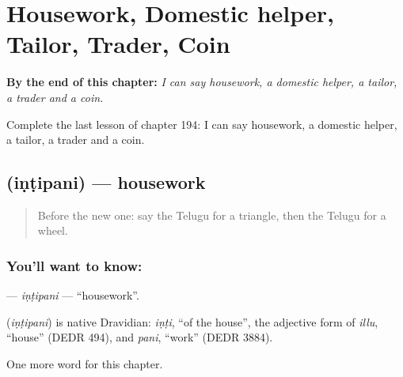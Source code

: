 
\chapter{Housework, Domestic helper, Tailor, Trader, Coin}
\label{ch:te-housework-domestic-helper-tailor-trader-coin}

\begin{chapteropening}
\textbf{By the end of this chapter:} \emph{I can say housework, a domestic helper, a tailor, a trader and a coin.}

Complete the last lesson of chapter 194: I can say housework, a domestic helper, a tailor, a trader and a coin.
\end{chapteropening}

\section[\texorpdfstring{\te{ఇంటిపని} (iṇṭipani)}{ఇంటిపని (iṇṭipani)}]{ (iṇṭipani) — housework}

\label{lesson:TE-C194-intipani}



\begin{quote}
Before the new one: say the Telugu for a triangle, then the Telugu for a wheel.
\end{quote}

\subsection*{You'll want to know: }
\textbf{} — \emph{iṇṭipani} — \textquotedblleft{}housework\textquotedblright{}.

\begin{cousinweb}
\textbf{} (\emph{iṇṭipani}) is native Dravidian: \emph{iṇṭi}, \textquotedblleft{}of the house\textquotedblright{}, the adjective form of \emph{illu}, \textquotedblleft{}house\textquotedblright{} (DEDR 494), and \emph{pani}, \textquotedblleft{}work\textquotedblright{} (DEDR 3884).
\end{cousinweb}

\begin{grammarlens}[title={What you've built}]
One more word for this chapter.
\end{grammarlens}

